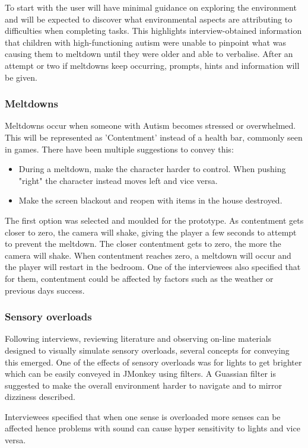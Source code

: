 \documentclass[11pt]{report}
\begin{document}
To start with the user will have minimal guidance on exploring the environment and will be expected to discover what environmental aspects are attributing to difficulties when completing tasks. This highlights interview-obtained information that children with high-functioning autism were unable to pinpoint what was causing them to meltdown until they were older and able to verbalise. After an attempt or two if meltdowns keep occurring, prompts, hints and information will be given.

\subsubsection{Meltdowns}
Meltdowns occur when someone with Autism becomes stressed or overwhelmed. This will be represented as 'Contentment' instead of a health bar, commonly seen in games. There have been multiple suggestions to convey this:

\begin{itemize}
\item During a meltdown, make the character harder to control. When pushing "right" the character instead moves left and vice versa.
\item Make the screen blackout and reopen with items in the house destroyed.
\end{itemize}

The first option was selected and moulded for the prototype. As contentment gets closer to zero, the camera will shake, giving the player a few seconds to attempt to prevent the meltdown. The closer contentment gets to zero, the more the camera will shake. When contentment reaches zero, a meltdown will occur and the player will restart in the bedroom. One of the interviewees also specified that for them, contentment could be affected by factors such as the weather or previous days success. 

\subsubsection{Sensory overloads}
Following interviews, reviewing literature and observing on-line materials designed to visually simulate sensory overloads, several concepts for conveying this emerged. One of the effects of sensory overloads was for lights to get brighter which can be easily conveyed in JMonkey using filters. A Guassian filter is suggested to make the overall environment harder to navigate and to mirror dizziness described. 

Interviewees specified that when one sense is overloaded more senses can be affected hence problems with sound can cause hyper sensitivity to lights and vice versa.
\end{document}
